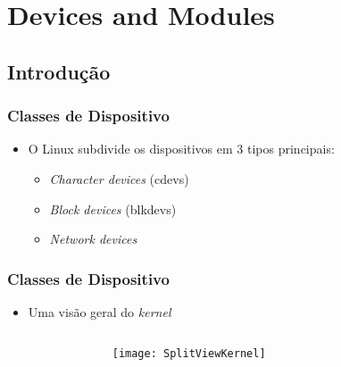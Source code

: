 \section{Devices and Modules} %

\subsection*{Introdução} %

\begin{frame}
	\frametitle{Classes de Dispositivo}
	\begin{itemize}
		\item<1-> O Linux subdivide os dispositivos em 3 tipos principais:
		\begin{itemize}
			\item<2-> \textit{Character devices} (cdevs)
			\item<2-> \textit{Block devices} (blkdevs)
			\item<2-> \textit{Network devices}
		\end{itemize}
	\end{itemize}
\end{frame}

\begin{frame}
	\frametitle{Classes de Dispositivo}
	\begin{itemize}
		\item<1-> Uma visão geral do \textit{kernel} \cite{LinuxDrivers}
	\end{itemize}
	\begin{columns}[T]
		\begin{column}{.15\textwidth}
		\end{column}
		\begin{column}{.7\textwidth}
			\uncover<1-> {\texttt{[image: SplitViewKernel]}}
		\end{column}
		\begin{column}{.15\textwidth}
		\end{column}
	\end{columns}
\end{frame}

